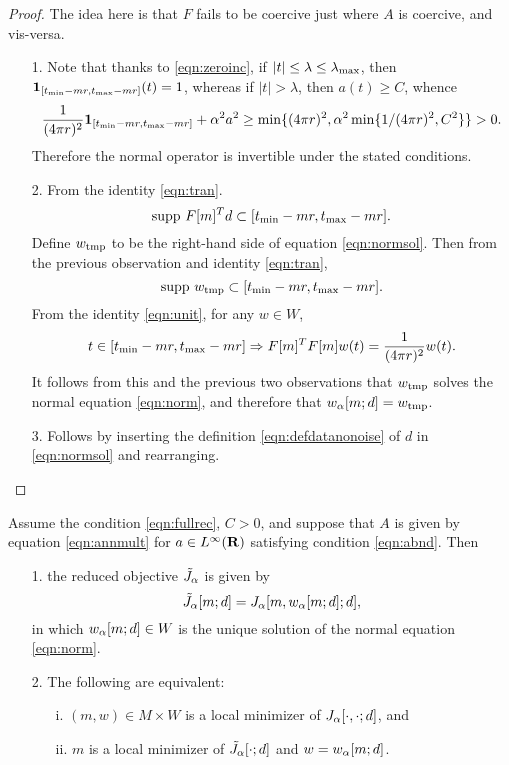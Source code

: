 \begin{proof}
  The idea here is that $F$ fails to be coercive just where $A$ is
  coercive, and vis-versa.
  \begin{itemize}
  \item[1. ]Note that thanks to \ref{eqn:zeroinc}, if $|t|\le
    \lambda \le \lambda_{\rm max}$, then ${\bf 1}_{[t_{\rm min}-mr,  
      t_{\rm max}-mr]}(t) = 1$, whereas if $|t|>\lambda$,
    then $a(t) \ge C$, whence
    \[
      \frac{1}{(4\pi r)^2}  {\bf 1}_{[t_{\rm min}-mr,  
        t_{\rm max}-mr]} + \alpha^2a^2  \ge \min\{(4\pi r)^2,
      \alpha^2\min\{1/(4\pi r)^2,C^2\} \}> 0.
    \]
    Therefore the normal operator is invertible under the stated
    conditions.

  \item[2. ]From the identity \ref{eqn:tran}.
    \[
      \mbox{supp }F[m]^Td \subset [t_{\rm min}-mr,t_{\rm max}-mr].
    \]
    Define $w_{\rm tmp}$ to be the right-hand side of equation \ref{eqn:normsol}. Then
    from the previous observation and identity \ref{eqn:tran},
    \[
      \mbox{supp }w_{\rm tmp} \subset [t_{\rm min}-mr,t_{\rm max}-mr].
    \]
    From the identity \ref{eqn:unit}, for any $w \in W$,
    \[
      t \in [t_{\rm min}-mr,t_{\rm max}-mr] \Rightarrow F[m]^TF[m]w(t)
      = \frac{1}{(4 \pi r)^2}w(t).
    \]
    It follows from this and the previous two observations that
    $w_{\rm tmp}$ solves the normal equation \ref{eqn:norm}, and
    therefore that $w_{\alpha}[m;d]=w_{\rm tmp}$.

  \item[3. ]Follows by inserting the definition
    \ref{eqn:defdatanonoise} of $d$ in \ref{eqn:normsol} and
    rearranging.
  \end{itemize}
\end{proof}

\begin{theorem}
  \label{thm:norminv}
  Assume the condition \ref{eqn:fullrec}, $C>0$, and suppose that $A$ is
  given by equation \ref{eqn:annmult} for $a \in L^{\infty}({\bf R})$
  satisfying condition \ref{eqn:abnd}.  Then
  \begin{itemize}
  \item[1. ]the reduced objective $\tilde{J}_{\alpha}$ is given by
    \begin{equation}
      \label{eqn:redexp1}
      \tilde{J}_{\alpha}[m;d] = J_{\alpha}[m,w_{\alpha}[m;d];d],
    \end{equation}
    in which $w_{\alpha}[m;d] \in W$ is the unique solution of the normal
    equation \ref{eqn:norm}.
  \item[2. ]The following are equivalent:
    \begin{itemize}
    \item[i. ]$(m,w) \in M \times W$ is a local minimizer of
      $J_{\alpha}[\cdot,\cdot;d]$, and
    \item[ii. ]$m$ is a local minimizer of $\tilde{J}_{\alpha}[\cdot;d]$ and
      $w=w_{\alpha}[m;d]$.
    \end{itemize}
  \end{itemize}
\end{theorem}

